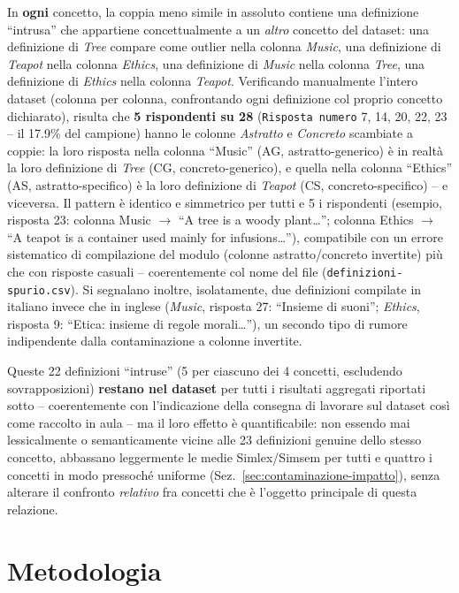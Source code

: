 \documentclass[12pt,a4paper]{article}
\begin{document}
In \textbf{ogni} concetto, la coppia meno simile in assoluto contiene una definizione ``intrusa'' che appartiene concettualmente a un \emph{altro} concetto del dataset: una definizione di \textit{Tree} compare come outlier nella colonna \textit{Music}, una definizione di \textit{Teapot} nella colonna \textit{Ethics}, una definizione di \textit{Music} nella colonna \textit{Tree}, una definizione di \textit{Ethics} nella colonna \textit{Teapot}. Verificando manualmente l'intero dataset (colonna per colonna, confrontando ogni definizione col proprio concetto dichiarato), risulta che \textbf{5 rispondenti su 28} (\texttt{Risposta numero} 7, 14, 20, 22, 23 -- il 17.9\% del campione) hanno le colonne \emph{Astratto} e \emph{Concreto} scambiate a coppie: la loro risposta nella colonna ``Music'' (AG, astratto-generico) \`e in realt\`a la loro definizione di \textit{Tree} (CG, concreto-generico), e quella nella colonna ``Ethics'' (AS, astratto-specifico) \`e la loro definizione di \textit{Teapot} (CS, concreto-specifico) -- e viceversa. Il pattern \`e identico e simmetrico per tutti e 5 i rispondenti (esempio, risposta 23: colonna Music $\to$ ``A tree is a woody plant\ldots''; colonna Ethics $\to$ ``A teapot is a container used mainly for infusions\ldots''), compatibile con un errore sistematico di compilazione del modulo (colonne astratto/concreto invertite) pi\`u che con risposte casuali -- coerentemente col nome del file (\texttt{definizioni-spurio.csv}). Si segnalano inoltre, isolatamente, due definizioni compilate in italiano invece che in inglese (\textit{Music}, risposta 27: ``Insieme di suoni''; \textit{Ethics}, risposta 9: ``Etica: insieme di regole morali\ldots''), un secondo tipo di rumore indipendente dalla contaminazione a colonne invertite.

Queste 22 definizioni ``intruse'' (5 per ciascuno dei 4 concetti, escludendo sovrapposizioni) \textbf{restano nel dataset} per tutti i risultati aggregati riportati sotto -- coerentemente con l'indicazione della consegna di lavorare sul dataset cos\`i come raccolto in aula -- ma il loro effetto \`e quantificabile: non essendo mai lessicalmente o semanticamente vicine alle 23 definizioni genuine dello stesso concetto, abbassano leggermente le medie Simlex/Simsem per tutti e quattro i concetti in modo pressoch\'e uniforme (Sez.~\ref{sec:contaminazione-impatto}), senza alterare il confronto \emph{relativo} fra concetti che \`e l'oggetto principale di questa relazione.

\section{Metodologia}
\end{document}
